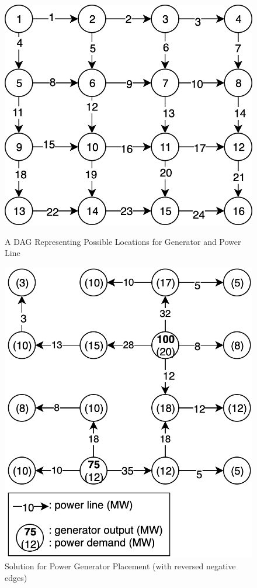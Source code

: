 \begin{figure}[h]
    \centering
    \begin{minipage}{.46\textwidth}
        \centering
        \includegraphics[width=0.9\linewidth]{hw2/hw2-prob4.png}
        \caption{A DAG Representing Possible Locations for Generator and Power Line}
        \label{fig:dag_power}
    \end{minipage}%
    \begin{minipage}{.46\textwidth}
        \centering
        \includegraphics[width=0.9\linewidth]{hw2/hw2-prob4-sol.png}
        \caption{Solution for Power Generator Placement (with reversed negative edges)}
        \label{fig:sol_power}
    \end{minipage}
\end{figure}


